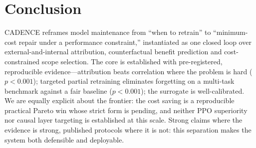 \documentclass[conference]{IEEEtran}
\begin{document}
\section{Conclusion}\label{sec:conc}
CADENCE reframes model maintenance from ``when to retrain'' to
``minimum-cost repair under a performance constraint,'' instantiated as one
closed loop over external-and-internal attribution, counterfactual benefit
prediction and cost-constrained scope selection. The core is established with
pre-registered, reproducible evidence---attribution beats correlation where the
problem is hard ($p<0.001$); targeted partial retraining eliminates forgetting
on a multi-task benchmark against a fair baseline ($p<0.001$); the surrogate is
well-calibrated. We are equally explicit about the frontier: the cost saving is
a reproducible practical Pareto win whose strict form is pending, and neither
PPO superiority nor causal layer targeting is established at this scale. Strong
claims where the evidence is strong, published protocols where it is not: this
separation makes the system both defensible and deployable.
\end{document}
